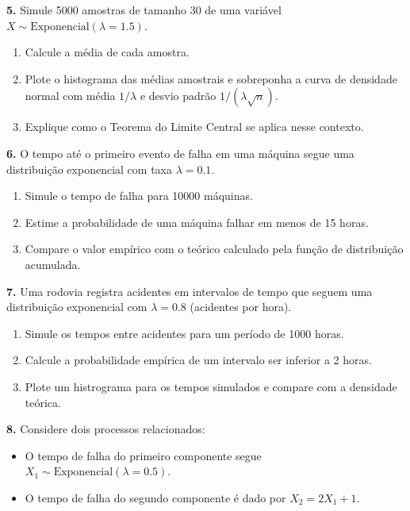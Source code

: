 \documentclass[
]{book}
\begin{document}
\textbf{5.} Simule 5000 amostras de tamanho 30 de uma variável \(X \sim \text{Exponencial}(\lambda = 1.5)\).

\begin{enumerate}
\def\labelenumi{(\alph{enumi})}
\item
  Calcule a média de cada amostra.
\item
  Plote o histograma das médias amostrais e sobreponha a curva de densidade normal com média \(1/\lambda\) e desvio padrão \(1/(\lambda \sqrt{n})\).
\item
  Explique como o Teorema do Limite Central se aplica nesse contexto.
\end{enumerate}

\textbf{6.} O tempo até o primeiro evento de falha em uma máquina segue uma distribuição exponencial com taxa \(\lambda = 0.1\).

\begin{enumerate}
\def\labelenumi{(\alph{enumi})}
\item
  Simule o tempo de falha para 10000 máquinas.
\item
  Estime a probabilidade de uma máquina falhar em menos de 15 horas.
\item
  Compare o valor empírico com o teórico calculado pela função de distribuição acumulada.
\end{enumerate}

\textbf{7.} Uma rodovia registra acidentes em intervalos de tempo que seguem uma distribuição exponencial com \(\lambda = 0.8\) (acidentes por hora).

\begin{enumerate}
\def\labelenumi{(\alph{enumi})}
\item
  Simule os tempos entre acidentes para um período de 1000 horas.
\item
  Calcule a probabilidade empírica de um intervalo ser inferior a 2 horas.
\item
  Plote um histrograma para os tempos simulados e compare com a densidade teórica.
\end{enumerate}

\textbf{8.} Considere dois processos relacionados:

\begin{itemize}
\item
  O tempo de falha do primeiro componente segue \(X_1 \sim \text{Exponencial}(\lambda = 0.5)\).
\item
  O tempo de falha do segundo componente é dado por \(X_2 = 2X_1 + 1\).
\end{itemize}
\end{document}
